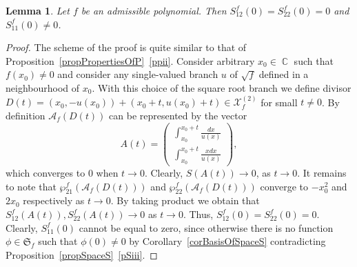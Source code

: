 \documentclass{amsart}
\numberwithin{equation}{section}
\newtheorem{lemma}[theorem]{Lemma}
\theoremstyle{definition}
\theoremstyle{remark}
\DeclareMathOperator{\CC}{\mathbb C}
\begin{document}
	\begin{lemma}\label{lemValuesAtZero}
		Let $f$ be an admissible polynomial. Then $S_{12}^f(0) = S_{22}^f(0) = 0$ and $S_{11}^f(0) \ne 0$.
	\end{lemma}
	\begin{proof}
		The scheme of the proof is quite similar to that of Proposition~\ref{propPropertiesOfP}~\ref{ppii}. Consider arbitrary $x_0 \in \CC$ such that $f(x_0) \ne 0$ and consider any single-valued branch $u$ of $\sqrt{f}$ defined in a neighbourhood of $x_0$. With this choice of the square root branch we define divisor $D(t) = \left(x_0, -u(x_0)\right) + \left(x_0 + t, u(x_0)+t\right) \in \mathcal X_f^{(2)}$ for small $t \ne 0$. By definition $\mathscr A_f(D(t))$ can be represented by the vector
		\[
		A(t) = \begin{pmatrix}
			\displaystyle \int_{x_0}^{x_0 + t}\frac{dx}{u(x)}\\ \displaystyle\int_{x_0}^{x_0 + t}\frac{xdx}{u(x)}
		\end{pmatrix},
		\]
		which converges to $0$ when $t \to 0$. Clearly, $S(A(t)) \to 0$, as $t \to 0$. It remains to note that $\wp_{21}^f(\mathscr A_f(D(t)))$ and $\wp_{22}^f(\mathscr A_f(D(t)))$ converge to $-x_0^2$ and $2x_0$ respectively as $t \to 0$. By taking product we obtain that $S_{12}^f(A(t)), S_{22}^f(A(t))  \to 0$ as $t \to 0$. Thus, $S_{12}^f(0) = S_{22}^f(0) = 0$. Clearly, $S_{11}^f(0)$ cannot be equal to zero, since otherwise there is no function $\phi \in \mathfrak S_f$ such that $\phi(0) \ne 0$ by Corollary~\ref{corBasisOfSpaceS} contradicting Proposition~\ref{propSpaceS}~\ref{pSiii}.
	\end{proof}
	
\end{document}
